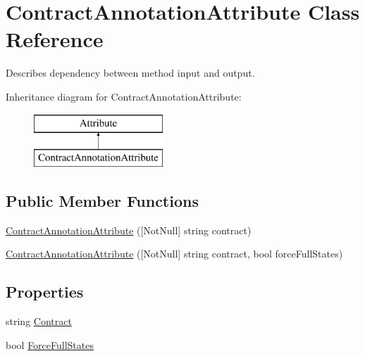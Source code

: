 \hypertarget{class_contract_annotation_attribute}{}\section{Contract\+Annotation\+Attribute Class Reference}
\label{class_contract_annotation_attribute}


Describes dependency between method input and output.  


Inheritance diagram for Contract\+Annotation\+Attribute\+:\begin{figure}[H]
\begin{center}
\leavevmode
\includegraphics[height=2.000000cm]{class_contract_annotation_attribute}
\end{center}
\end{figure}
\subsection*{Public Member Functions}
\begin{DoxyCompactItemize}
\item 
\hyperlink{class_contract_annotation_attribute_a635552c48df4e94f26deb7598f7a5028}{Contract\+Annotation\+Attribute} (\mbox{[}Not\+Null\mbox{]} string contract)
\item 
\hyperlink{class_contract_annotation_attribute_a886eedce3d8c7a269549a3293a2bfd99}{Contract\+Annotation\+Attribute} (\mbox{[}Not\+Null\mbox{]} string contract, bool force\+Full\+States)
\end{DoxyCompactItemize}
\subsection*{Properties}
\begin{DoxyCompactItemize}
\item 
string \hyperlink{class_contract_annotation_attribute_a19445968a4365371890d047311eaa1c4}{Contract}
\item 
bool \hyperlink{class_contract_annotation_attribute_a329c6f99fe2ed0c08df3898586cbf965}{Force\+Full\+States}
\end{DoxyCompactItemize}


